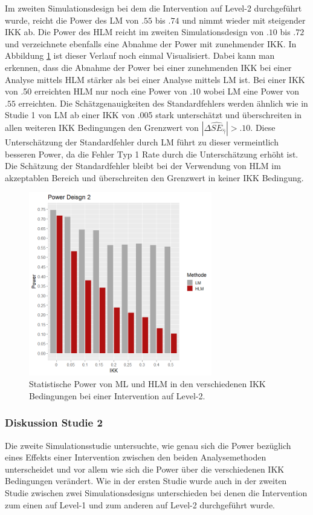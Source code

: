 \documentclass[12pt]{article}\usepackage[]{graphicx}\usepackage[]{color}
\begin{document}
Im zweiten Simulationsdesign bei dem die Intervention auf Level-2 durchgeführt wurde, reicht die Power des LM von $.55$ bis $.74$ und nimmt wieder mit steigender IKK ab. Die Power des HLM reicht im zweiten Simulationsdesign von $.10$ bis $.72$ und verzeichnete ebenfalls eine Abnahme der Power mit zunehmender IKK. In Abbildung \ref{fig:power_design2} ist dieser Verlauf noch einmal Visualisiert. Dabei kann man erkennen, dass die Abnahme der Power bei einer zunehmenden IKK bei einer Analyse mittels HLM stärker als bei einer Analyse mittels LM ist. Bei einer IKK von .50 erreichten HLM nur noch eine Power von $.10$ wobei LM eine Power von $.55$ erreichten. Die Schätzgenauigkeiten des Standardfehlers werden ähnlich wie in Studie 1 von LM ab einer IKK von .005 stark unterschätzt und überschreiten in allen weiteren IKK Bedingungen den Grenzwert von $|\Delta\widehat{SE}_{\widehat{\gamma}}| > .10$. Diese Unterschätzung der Standardfehler durch LM führt zu dieser vermeintlich besseren Power, da die Fehler Typ 1 Rate durch die Unterschätzung erhöht ist. Die Schätzung der Standardfehler bleibt bei der Verwendung von HLM im akzeptablen Bereich und überschreiten den Grenzwert in keiner IKK Bedingung. 
\begin{figure}[t!]
\centering
\captionsetup{width=8cm}
\includegraphics[width=8cm, height=8cm]{power_design2}
\caption{Statistische Power von ML und HLM in den verschiedenen IKK Bedingungen bei einer Intervention auf Level-2.}
\label{fig:power_design2}
\end{figure}

\subsubsection{Diskussion Studie 2}
Die zweite Simulationsstudie untersuchte, wie genau sich die Power bezüglich eines Effekts einer Intervention zwischen den beiden Analysemethoden unterscheidet und vor allem wie sich die Power über die verschiedenen IKK Bedingungen verändert. Wie in der ersten Studie wurde auch in der zweiten Studie zwischen zwei Simulationsdesigns unterschieden bei denen die Intervention zum einen auf Level-1 und zum anderen auf Level-2 durchgeführt wurde.
\end{document}
